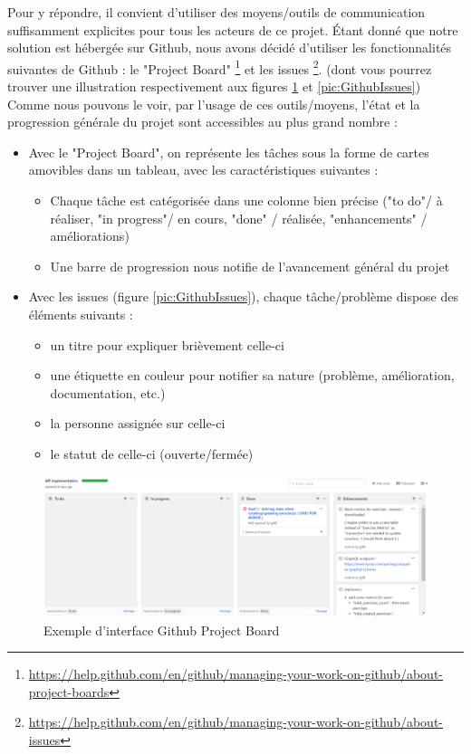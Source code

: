 Pour y répondre, il convient d'utiliser des moyens/outils de communication suffisamment explicites pour tous les acteurs de ce projet. Étant donné que notre solution est hébergée sur Github, nous avons décidé d'utiliser les fonctionnalités suivantes de Github : le "Project Board" \footnote{\url{https://help.github.com/en/github/managing-your-work-on-github/about-project-boards}} et les issues \footnote{\url{https://help.github.com/en/github/managing-your-work-on-github/about-issues}}. (dont vous pourrez trouver une illustration respectivement aux figures \ref{pic:GithubBoard} et \ref{pic:GithubIssues})\\

Comme nous pouvons le voir, par l'usage de ces outils/moyens, l'état et la progression générale du projet sont accessibles au plus grand nombre : 
\begin{itemize}
    \item Avec le "Project Board", on représente les tâches sous la forme de cartes amovibles dans un tableau, avec les caractéristiques suivantes :
    \begin{itemize}
        \item Chaque tâche est catégorisée dans une colonne bien précise ("to do"/ à réaliser, "in progress"/ en cours, "done" / réalisée, "enhancements" / améliorations)
        \item Une barre de progression nous notifie de l'avancement général du projet
    \end{itemize}
    \item Avec les issues (figure \ref{pic:GithubIssues}), chaque tâche/problème dispose des éléments suivants : 
    \begin{itemize}
        \item un titre pour expliquer brièvement celle-ci
        \item une étiquette en couleur pour notifier sa nature (problème, amélioration, documentation, etc.)
        \item la personne assignée sur celle-ci
        \item le statut de celle-ci (ouverte/fermée)
    \end{itemize}
\end{itemize}


\begin{figure}[H]
    \includegraphics[width=\textwidth,height=\textheight,keepaspectratio]{images/approche/trelloLike.PNG}
    \centering
    \caption{Exemple d'interface Github Project Board}
    \label{pic:GithubBoard}
\end{figure}

